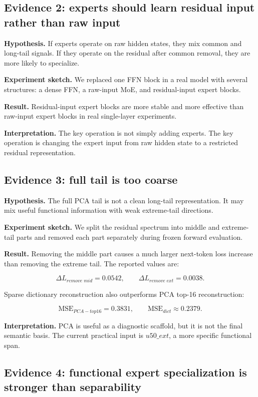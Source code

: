 \documentclass[11pt]{article}
\begin{document}
\subsection{Evidence 2: experts should learn residual input rather than raw input}

\textbf{Hypothesis.} If experts operate on raw hidden states, they mix common and long-tail signals. If they operate on the residual after common removal, they are more likely to specialize.

\textbf{Experiment sketch.} We replaced one FFN block in a real model with several structures: a dense FFN, a raw-input MoE, and residual-input expert blocks.

\textbf{Result.} Residual-input expert blocks are more stable and more effective than raw-input expert blocks in real single-layer experiments.

\textbf{Interpretation.} The key operation is not simply adding experts. The key operation is changing the expert input from raw hidden state to a restricted residual representation.

\subsection{Evidence 3: full tail is too coarse}

\textbf{Hypothesis.} The full PCA tail is not a clean long-tail representation. It may mix useful functional information with weak extreme-tail directions.

\textbf{Experiment sketch.} We split the residual spectrum into middle and extreme-tail parts and removed each part separately during frozen forward evaluation.

\textbf{Result.} Removing the middle part causes a much larger next-token loss increase than removing the extreme tail. The reported values are:

$$
\Delta L_{remove\;mid}=0.0542,
\qquad
\Delta L_{remove\;ext}=0.0038.
$$

Sparse dictionary reconstruction also outperforms PCA top-16 reconstruction:

$$
\mathrm{MSE}_{PCA-top16}=0.3831,
\qquad
\mathrm{MSE}_{dict}\approx0.2379.
$$

\textbf{Interpretation.} PCA is useful as a diagnostic scaffold, but it is not the final semantic basis. The current practical input is $u50\_ext$, a more specific functional span.

\subsection{Evidence 4: functional expert specialization is stronger than separability}
\end{document}
